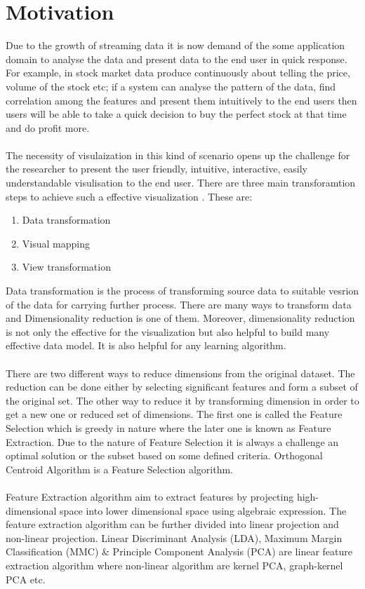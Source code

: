\section{Motivation}
Due to the growth of streaming data it is now demand of the some application domain to analyse the data and present data to the end user in quick response. For example, in stock market data produce continuously about telling the price, volume of the stock etc; if a system can analyse the pattern of the data, find correlation among the features and present them intuitively to the end users then users will be able to take a quick decision to buy the perfect stock at that time and do profit more.\\\\
The necessity of visulaization in this kind of scenario opens up the challenge for the researcher to present the user friendly, intuitive, interactive, easily understandable visulisation to the end user. There are three main transforamtion steps to achieve such a effective visualization \cite{pf03}. These are: 
\begin{enumerate}
	\item Data transformation
	\item Visual mapping
	\item View transformation
\end{enumerate}
Data transformation is the process of transforming source data to suitable vesrion of the data for carrying further process. There are many ways to transform data and Dimensionality reduction is one of them. Moreover, dimensionality reduction is not only the effective for the visualization but also helpful to build many effective data model. It is also helpful for any learning algorithm.\\\\
There are two different ways to reduce dimensions from the original dataset. The reduction can be done either by selecting significant features and form a subset of the original set. The other way to reduce it by transforming dimension in order to get a new one or reduced set of dimensions. The first one is called the Feature Selection which is greedy in nature where the later one is known as Feature Extraction. Due to the nature of Feature Selection it is always a challenge an optimal solution or the subset based on some defined criteria. Orthogonal Centroid Algorithm is a Feature Selection algorithm.\\\\
Feature Extraction algorithm aim to extract features by projecting high-dimensional space into lower dimensional space using algebraic expression. The feature extraction algorithm can be further divided into linear projection and non-linear projection. Linear Discriminant Analysis (LDA), Maximum Margin Classification (MMC) \& Principle Component Analysis (PCA) are linear feature extraction algorithm \cite{thesis1} where non-linear algorithm are kernel PCA, graph-kernel PCA etc.\\\\
